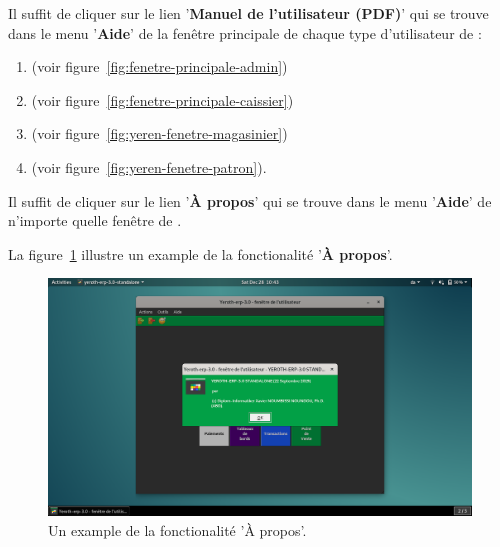
\newpage
{}

Il suffit de cliquer sur le lien '\textbf{Manuel de l'utilisateur (PDF)}'
qui se trouve dans le menu '\textbf{Aide}' de la fen\^etre
principale de chaque type d'utilisateur de \yeroth:

\begin{enumerate}[1)]
	\item \admin (voir figure~\ref{fig:fenetre-principale-admin})
	\item \caissier (voir figure~\ref{fig:fenetre-principale-caissier})
	\item \magasinier (voir figure~\ref{fig:yeren-fenetre-magasinier})
	\item \manager (voir figure~\ref{fig:yeren-fenetre-patron}).		
\end{enumerate}



Il suffit de cliquer sur le lien '\textbf{\`A propos}' qui
se trouve dans le menu '\textbf{Aide}' de n'importe quelle
fen\^etre de \yeroth.

La figure~\ref{fig:yeren-apropos}
illustre un example de la fonctionalit\'e 
'\textbf{\`A propos}'.

\begin{figure}[!htbp]
	\centering
	\includegraphics[scale=0.369]{images/yeren-apropos.png}
	\caption{Un example de la fonctionalit\'e '\`A propos'.}
	\label{fig:yeren-apropos}
\end{figure}


